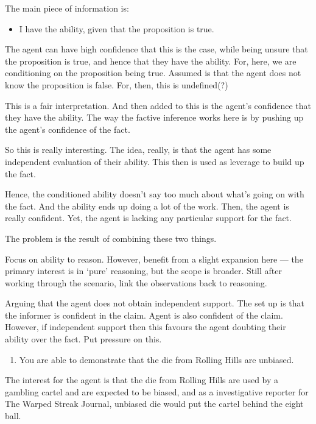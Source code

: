 \documentclass[10pt]{article}
\newcommand{\hozlinedash}[0]{%
  \noindent\hdashrule[0.5ex][c]{\textwidth}{.1pt}{2.5pt}
}
\begin{document}
\begin{note}
  The main piece of information is:
  \begin{itemize}
  \item I have the ability, given that the proposition is true.
  \end{itemize}
  The agent can have high confidence that this is the case, while being unsure that the proposition is true, and hence that they have the ability.
  For, here, we are conditioning on the proposition being true.
  Assumed is that the agent does not know the proposition is false.
  For, then, this is undefined(?)

  This is a fair interpretation.
  And then added to this is the agent's confidence that they have the ability.
  The way the factive inference works here is by pushing up the agent's confidence of the fact.

  So this is really interesting.
  The idea, really, is that the agent has some independent evaluation of their ability.
  This then is used as leverage to build up the fact.

  Hence, the conditioned ability doesn't say too much about what's going on with the fact.
  And the ability ends up doing a lot of the work.
  Then, the agent is really confident.
  Yet, the agent is lacking any particular support for the fact.

  The problem is the result of combining these two things.
\end{note}


\hozlinedash

Focus on ability to reason.
However, benefit from a slight expansion here --- the primary interest is in `pure' reasoning, but the scope is broader.
Still after working through the scenario, link the observations back to reasoning.

Arguing that the agent does not obtain independent support.
The set up is that the informer is confident in the claim.
Agent is also confident of the claim.
However, if independent support then this favours the agent doubting their ability over the fact.
Put pressure on this.


\begin{enumerate}
\item You are able to demonstrate that the die from Rolling Hills are unbiased.
\end{enumerate}

The interest for the agent is that the die from Rolling Hills are used by a gambling cartel and are expected to be biased, and as a investigative reporter for The Warped Streak Journal, unbiased die would put the cartel behind the eight ball.
\end{document}

